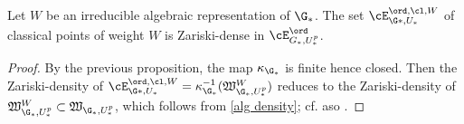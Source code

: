 \begin{lemm}\label{dense}
Let $W$ be an irreducible algebraic representation of $\G_{*}$. The set $\cE^{\ord, \cl, W}_{\G*, U_{*}}$
 of classical points of weight $W$
 is Zariski-dense in $\cE^{\ord}_{G_{*}, U_{*}^{p}}$.
\end{lemm}
\begin{proof}
By the previous proposition, the map $\kappa_{\G_{*}}$ is finite hence closed. Then the Zariski-density of
 $\cE^{\ord, \cl, W}_{\G*, U_{*}}=\kappa_{\G_{*}}^{-1} ( \mathfrak{W}_{\G_{*}, U^{p}_{*}}^{W})$ reduces to the Zariski-density of $\mathfrak{W}_{\G_{*}, U^{p}_{*}}^{W} \subset \mathfrak{W}_{\G_{*}, U^{p}_{*}}$, which follows from \eqref{alg density}; cf. aso \cite[Lemma 3.8]{SW99}.
 \end{proof}


































